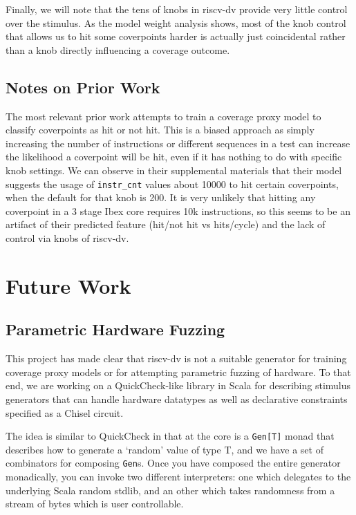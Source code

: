 \documentclass[sigconf,noacm]{acmart}
\begin{document}
Finally, we will note that the tens of knobs in riscv-dv provide very little control over the stimulus.
As the model weight analysis shows, most of the knob control that allows us to hit some coverpoints harder is actually just coincidental rather than a knob directly influencing a coverage outcome.

\subsection{Notes on Prior Work}

The most relevant prior work\cite{design2vec} attempts to train a coverage proxy model to classify coverpoints as hit or not hit.
This is a biased approach as simply increasing the number of instructions or different sequences in a test can increase the likelihood a coverpoint will be hit, even if it has nothing to do with specific knob settings.
We can observe in their supplemental materials that their model suggests the usage of \verb|instr_cnt| values about 10000 to hit certain coverpoints, when the default for that knob is 200.
It is very unlikely that hitting any coverpoint in a 3 stage Ibex core requires 10k instructions, so this seems to be an artifact of their predicted feature (hit/not hit vs hits/cycle) and the lack of control via knobs of riscv-dv.

\section{Future Work}

\subsection{Parametric Hardware Fuzzing}

This project has made clear that riscv-dv is not a suitable generator for training coverage proxy models or for attempting parametric fuzzing of hardware.
To that end, we are working on a QuickCheck-like library in Scala for describing stimulus generators that can handle hardware datatypes as well as declarative constraints specified as a Chisel circuit.

The idea is similar to QuickCheck in that at the core is a \texttt{Gen[T]} monad that describes how to generate a `random' value of type T, and we have a set of combinators for composing \texttt{Gen}s.
Once you have composed the entire generator monadically, you can invoke two different interpreters: one which delegates to the underlying Scala random stdlib, and an other which takes randomness from a stream of bytes which is user controllable.
\end{document}

